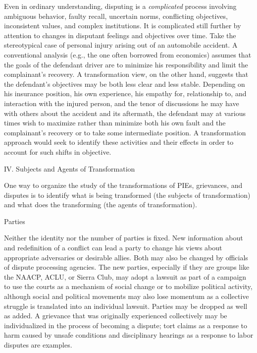 \documentclass[11pt,letterpaper,twoside]{article}
\begin{document}
Even in ordinary understanding, disputing is a \emph{complicated}
process involving ambiguous behavior, faulty recall, uncertain norms,
conflicting objectives, inconsistent values, and complex institutions.
It is complicated still further by attention to changes in disputant
feelings and objectives over time. Take the stereotypical case of
personal injury arising out of an automobile accident. A conventional
analysis (e.g., the one often borrowed from economics) assumes that the
goals of the defendant driver are to minimize his responsibility and
limit the complainant's recovery. A transformation view, on the other
hand, suggests that the defendant's objectives may be both less clear
and less stable. Depending on his insurance position, his own
experience, his empathy for, relationship to, and interaction with the
injured person, and the tenor of discussions he may have with others
about the accident and its aftermath, the defendant may at various times
wish to maximize rather than minimize both his own fault and the
complainant's recovery or to take some intermediate position. A
transformation approach would seek to identify these activities and
their effects in order to account for such shifts in objective.

{IV. Subjects and Agents of Transformation}

One way to organize the study of the transformations of PIEs,
grievances, and disputes is to identify what is being transformed (the
subjects of transformation) and what does the transforming (the agents
of transformation).

{Parties}

Neither the identity nor the number of parties is fixed. New information
about and redefinition of a conflict can lead a party to change his
views about appropriate adversaries or desirable allies. Both may also
be changed by officials of dispute processing agencies. The new parties,
especially if they are groups like the NAACP, ACLU, or Sierra Club, may
adopt a lawsuit as part of a campaign to use the courts as a mechanism
of social change or to mobilize political activity, although social and
political movements may also lose momentum as a collective struggle is
translated into an individual lawsuit. Parties may be dropped as well as
added. A grievance that was originally experienced collectively may be
individualized in the process of becoming a dispute; tort claims as a
response to harm caused by unsafe conditions and disciplinary hearings
as a response to labor disputes are examples.
\end{document}
